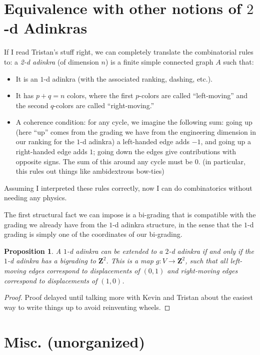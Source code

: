 \documentclass[12pt,twoside,singlespace]{article}
\numberwithin{equation}{section}
\newtheorem{prop}[equation]{Proposition}
\theoremstyle{definition}
\newcommand{\ZZ}{\mathbf{Z}}
\begin{document}
\appendix
\section{Equivalence with other notions of $2$-d Adinkras}


If I read Tristan's stuff right, we can completely translate the combinatorial rules to: a \emph{2-d adinkra} (of dimension $n$) is a finite simple connected graph $A$ such that:
\begin{itemize}
\item It is an $1$-d adinkra (with the associated ranking, dashing, etc.).
\item It has $p + q = n$ colors, where the first $p$-colors are called ``left-moving'' and the second $q$-colors are called ``right-moving.''
\item A coherence condition: for any cycle, we imagine the following sum: going up (here ``up'' comes from the grading we have from the engineering dimension in our ranking for the $1$-d adinkra) a left-handed edge adds $-1$, and going up a right-handed edge adds $1$; going down the edges give contributions with opposite signs. The sum of this around any cycle must be $0$. (in particular, this rules out things like ambidextrous bow-ties)
\end{itemize} 

Assuming I interpreted these rules correctly, now I can do combinatorics without needing any physics.


The first structural fact we can impose is a bi-grading that is compatible with the grading we already have from the $1$-d adinkra structure, in the sense that the $1$-d grading is simply one of the coordinates of our bi-grading.

\begin{prop}
A $1$-d adinkra can be extended to a $2$-d adinkra if and only if the $1$-d adinkra has a \emph{bigrading} to $\ZZ^2$. This is a map $g: V \rightarrow \ZZ^2$, such that all left-moving edges correspond to displacements of $(0, 1)$ and right-moving edges correspond to displacements of $(1, 0)$.
\end{prop}

\begin{proof}
Proof delayed until talking more with Kevin and Tristan about the easiest way to write things up to avoid reinventing wheels.
\end{proof}

\section{Misc. (unorganized)}
\end{document}
